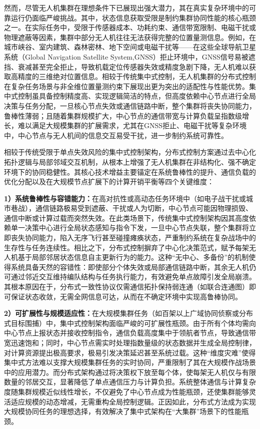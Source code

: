 然而，尽管无人机集群在理想条件下已展现出强大潜力，其在真实复杂环境中的可靠运行仍面临严峻挑战。其中，状态信息获取受限是制约集群协同性能的核心瓶颈之一。在实际任务中，受限于传感器成本、功耗约束、通信带宽限制、电磁干扰或物理遮蔽等因素，集群中部分无人机往往无法获得完整的位置量测信息\cite{20202696}。例如，在城市峡谷、室内建筑、森林密林、地下空间或电磁干扰等——在这些全球导航卫星系统（Global Navigation Satellite System,GNSS）拒止环境中，GNSS信号易被遮挡、衰减甚至完全拒止，导致机载定位传感器失效或精度急剧下降，无人机难以获取高精度的三维绝对位置信息\cite{XXCN202401001, CSJX20250908001}。相较于传统集中式控制，无人机集群的分布式控制在复杂任务场景与非全维位置量测约束下展现出更为突出的适配性与性能优势。集中式控制虽具备控制精度高、实现逻辑简洁的特点，但高度依赖中心节点进行全局决策与任务分配，一旦核心节点失效或通信链路中断，整个集群将丧失协同能力，鲁棒性薄弱\cite{11207014}；且随着集群规模扩大，中心节点的通信带宽与计算负载呈指数级增长，难以满足大规模集群的扩展需求，尤其在GNSS拒止、电磁干扰等复杂环境中，中心节点与无人机间的信息交互易受干扰，进一步制约系统可靠性\cite{XXCN202401001}。

相较于传统受限于单点失效风险的集中式控制架构，分布式控制方案通过去中心化拓扑逻辑与局部邻域交互机制，从根本上增强了无人机集群在非结构化、强不确定环境下的协同稳健性。其核心技术增益主要锚定在系统鲁棒性的提升、通信负载的优化分配以及在大规模节点扩展下的计算开销平衡等四个关键维度：

\textbf{1）系统鲁棒性与容错能力：}在高对抗性或高动态任务环境中（如电子战干扰或城市巷战），通信链路极易受到遮蔽、干扰或人为切断，中心节点可能因物理损毁、通信中断或计算过载而突然失效\cite{JCGC202401005}。在此类场景下，传统集中式控制架构因其高度依赖单一决策中心进行全局状态感知与指令下发，一旦中心节点失联，整个集群将立即丧失协同能力，陷入无序飞行甚至碰撞瘫痪状态，严重制约系统在复杂战场中的生存性与任务连续性。相比之下，分布式控制摒弃了中心化决策范式，赋予每架无人机基于局部邻居状态信息自主更新行为的能力。这种“无中心、多备份”的机制使得系统具备天然的容错性：即使部分个体失效或局部通信链路中断，其余无人机仍可通过邻近交互维持编队结构与任务执行能力，有效避免单点故障引发全局崩溃。其根本原因在于，分布式一致性协议仅需通信拓扑保持弱连通（如联合连通图）即可保证状态收敛，无需全网信息可达，从而在不确定环境中实现高鲁棒协同\cite{1014083939.nh}。

\textbf{2）可扩展性与规模适应性：}在大规模集群任务（如百架以上广域协同侦察或分布式目标围捕）中，集中式控制架构面临严峻的可扩展性瓶颈。由于所有个体均需向中心节点上报状态并接收控制指令，通信负载高度集中于领航者节点，导致通信带宽迅速饱和；同时，中心节点需实时处理指数量级的状态数据并生成全局控制律，对计算资源提出极高要求，极易引发决策延迟甚至系统过载\cite{WXDG202301002}。这种“维度灾难”使得集中式方法难以支撑大规模集群任务的实时协同，严重限制了其在大规模作战场景中的应用潜力。而分布式架构通过将决策权下放至每个体，使每架无人机仅与有限数量的邻居交互，显著降低了单点通信压力与计算负担。系统整体通信与计算复杂度随集群规模近似线性增长，不仅避免了中心节点成为性能瓶颈，还使集群能够灵活适应规模的动态增减，无需重构全局控制逻辑。正因如此，分布式方法成为实现大规模协同任务的理想选择，有效解决了集中式架构在“大集群”场景下的性能瓶颈\cite{JCGC202401005}。

